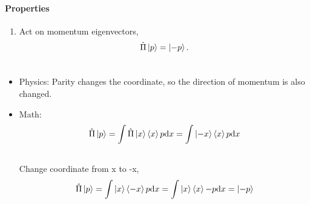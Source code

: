 \documentclass[letterpaper,10pt,english]{sphinxmanual}
\def\d{{\rm d}}
\begin{document}
\paragraph{Properties}
\label{QuantumMechanics:properties}\begin{enumerate}
\item {} 
Act on momentum eigenvectors,
\begin{gather}
\begin{split}\hat \Pi \ket{p} = \ket{-p} .\end{split}\notag\\\begin{split}\end{split}\notag
\end{gather}
\end{enumerate}
\begin{itemize}
\item {} 
Physics: Parity changes the coordinate, so the direction of momentum is also changed.

\item {} 
Math:
\begin{gather}
\begin{split}\hat \Pi \ket{p} = \int \hat \Pi \ket{x}\braket{x}{p}\d x= \int \ket{-x}\braket{x}{p}\d x\end{split}\notag\\\begin{split}\end{split}\notag
\end{gather}
Change coordinate from x to -x,
\begin{gather}
\begin{split}\hat \Pi \ket{p} = \int \ket{x}\braket{-x}{p}\d x = \int \ket{x}\braket{x}{-p}\d x  = \ket{-p}\end{split}\notag\\\begin{split}\end{split}\notag
\end{gather}
\end{itemize}
\end{document}
